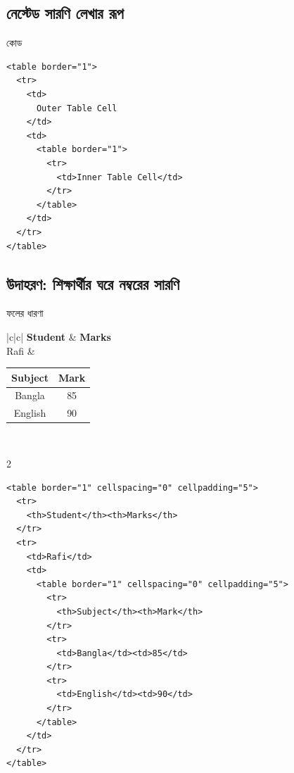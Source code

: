 \subsection{নেস্টেড সারণি লেখার রূপ}

\begin{examplebox}{কোড}
\begin{verbatim}
<table border="1">
  <tr>
    <td>
      Outer Table Cell
    </td>
    <td>
      <table border="1">
        <tr>
          <td>Inner Table Cell</td>
        </tr>
      </table>
    </td>
  </tr>
</table>
\end{verbatim}
\end{examplebox}

\subsection{উদাহরণ: শিক্ষার্থীর ঘরে নম্বরের সারণি}

\begin{examplebox}{ফলের ধারণা}
\begin{center}
\begin{tabular}{|c|c|}
\hline
\textbf{Student} & \textbf{Marks} \\
\hline
Rafi & \begin{tabular}{|c|c|}\hline
\textbf{Subject} & \textbf{Mark}\\\hline
Bangla & 85\\\hline
English & 90\\\hline
\end{tabular} \\
\hline
\end{tabular}
\end{center}
\end{examplebox}

\par{}\par
\begin{multicols}{2}
\begin{verbatim}
<table border="1" cellspacing="0" cellpadding="5">
  <tr>
    <th>Student</th><th>Marks</th>
  </tr>
  <tr>
    <td>Rafi</td>
    <td>
      <table border="1" cellspacing="0" cellpadding="5">
        <tr>
          <th>Subject</th><th>Mark</th>
        </tr>
        <tr>
          <td>Bangla</td><td>85</td>
        </tr>
        <tr>
          <td>English</td><td>90</td>
        </tr>
      </table>
    </td>
  </tr>
</table>
\end{verbatim}
\end{multicols}


